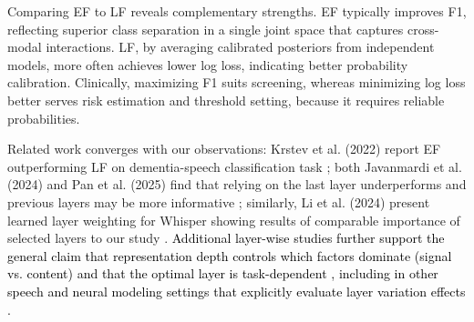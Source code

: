 \documentclass{article}
\begin{document}
{Comparing EF to LF reveals complementary strengths. EF typically improves F1, reflecting superior class separation in a single joint space that captures cross-modal interactions. LF, by averaging calibrated posteriors from independent models, more often achieves lower log loss, indicating better probability calibration. Clinically, maximizing F1 suits screening, whereas minimizing log loss better serves risk estimation and threshold setting, because it requires reliable probabilities.

Related work converges with our observations: Krstev et al. (2022) report EF outperforming LF on dementia-speech classification task \cite{krstev2022}; both Javanmardi et al. (2024) and Pan et al. (2025) find that relying on the last layer underperforms and previous layers may be more informative \cite{javanmardi2024, pan2025}; similarly, Li et al. (2024) present learned layer weighting for Whisper showing results of comparable importance of selected layers to our study \cite{li2024}. \textcolor{black}{Additional layer-wise studies further support the general claim that representation depth controls which factors dominate (signal vs. content) and that the optimal layer is task-dependent \cite{pasad2021, pasad2023, maji2024, cooper2025}, including in other speech and neural modeling settings that explicitly evaluate layer variation effects \cite{anderson2024}.}




}
\end{document}
